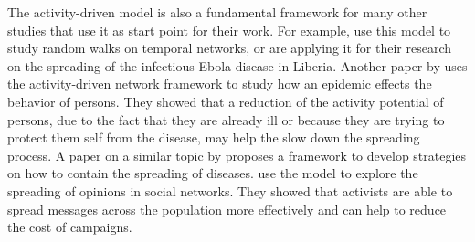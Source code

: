 The activity-driven model is also a fundamental framework for many other studies that use it as start point for their work.
For example, \citet{Perra2012b} use this model to study random walks on temporal networks, or \citet{Rizzo2016} are applying it for their research on the spreading of the infectious Ebola disease in Liberia.
Another paper by \citet{Rizzo2014} uses the activity-driven network framework to study how an epidemic effects the behavior of persons.
They showed that a reduction of the activity potential of persons, due to the fact that they are already ill or because they are trying to protect them self from the disease, may help the slow down the spreading process.
A paper on a similar topic by \citet{Liu2014} proposes a framework to develop strategies on how to contain the spreading of diseases.
\citet{Mistry2015} use the model to explore the spreading of opinions in social networks.
They showed that activists are able to spread messages across the population more effectively and can help to reduce the cost of campaigns.

